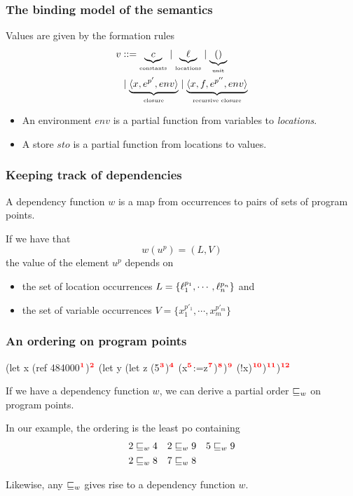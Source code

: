 \documentclass{beamer}
\begin{document}
  \newcommand{\desc}[2]{\ensuremath{\underbrace{#1}_{\text{\tiny{#2}}}}}

\begin{frame}
  \frametitle{The binding model of the semantics}

  Values are given by the formation rules
%
  \begin{align*}
    v & ::= \desc{c}{constants} \mid \desc{\ell}{locations} \mid
        \desc{()}{unit} \\
    & \mid  \desc{\langle x,e^{p'},env\rangle}{closure} \mid
      \desc{\langle x,f,e^{p''},env\rangle}{recursive closure}
   \end{align*}

   \begin{itemize}
   \item An environment $env$ is a partial function from
variables to \emph{locations}.
\item A store $sto$ is a partial function from locations to values.
   \end{itemize}

\end{frame}
\begin{frame} \frametitle{Keeping track of dependencies}

  A dependency function $w$ is a map from occurrences to pairs of sets
  of program points.
  
  If we have that
\[ w (u^p)=(L,V) \]
%
the value of the element $u^p$ depends on
\begin{itemize}
\item the set of location occurrences
  $L=\{\ell_1^{p_1},\cdots,\ell_n^{p_n}\}$ and
\item the set of variable occurrences $V =\{x_1^{p'_1},\cdots,x_m^{p'_m}\}$

\end{itemize}

\end{frame}

\begin{frame}[fragile]
  \frametitle{An ordering on program points}

   \begin{rescript}
   (let x (ref 484000$\mathbf{\textcolor{red}{^{1}}}$)$\mathbf{\textcolor{red}{^{2}}}$
     (let y (let z (5$\mathbf{\textcolor{red}{^{3}}}$)$\mathbf{\textcolor{red}{^{4}}}$
        (x$\mathbf{\textcolor{red}{^{5}}}$:=z$\mathbf{\textcolor{red}{^{7}}}$)$\mathbf{\textcolor{red}{^{8}}}$)$\mathbf{\textcolor{red}{^{9}}}$ (!x)$\mathbf{\textcolor{red}{^{10}}}$)$\mathbf{\textcolor{red}{^{11}}}$)$\mathbf{\textcolor{red}{^{12}}}$
\end{rescript}

      If we have a dependency function $w$, we can derive a partial order $\sqsubseteq_w$ on
      program points.

      In our example, the ordering is the least po containing
%
      \begin{align*}
        2 \sqsubseteq_w 4 && 2 \sqsubseteq_w 9 && 5 \sqsubseteq_w 9 \\
        2 \sqsubseteq_w 8 && 7 \sqsubseteq_w 8
      \end{align*}

      Likewise, any $\sqsubseteq_w$ gives rise to a dependency function $w$.
\end{frame}
\end{document}
